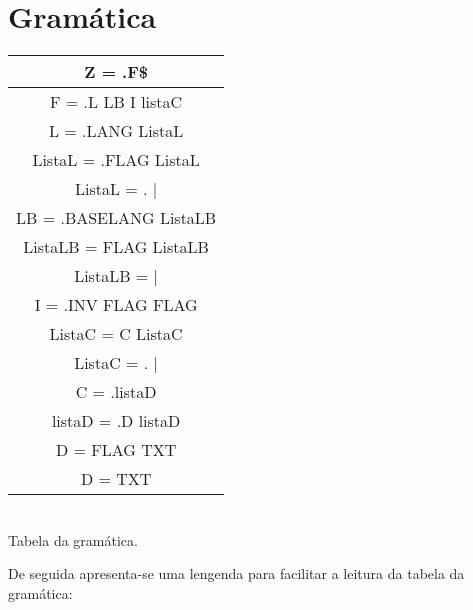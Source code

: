 \documentclass[11pt,a4paper]{report}%
\begin{document}
\section{Gramática}


\begin{center}
\begin{tabular}{ |c| } 
 \hline
Z = .F\$\\
\hline
F = .L LB I listaC\\
L = .LANG ListaL\\
ListaL = .FLAG ListaL\\
ListaL = .        |\\
LB = .BASELANG ListaLB\\
ListaLB = FLAG ListaLB\\
ListaLB =         |\\
I = .INV FLAG FLAG\\
ListaC = C ListaC\\
ListaC = .        |\\
C = .listaD\\
listaD = .D listaD\\
D = FLAG TXT\\
D = TXT\\
\hline
\end{tabular}
\caption{\label{tab:table-name}\\Tabela da gramática.}
\end{center}

De seguida apresenta-se uma lengenda para facilitar a leitura da tabela da gramática:
\end{document}
